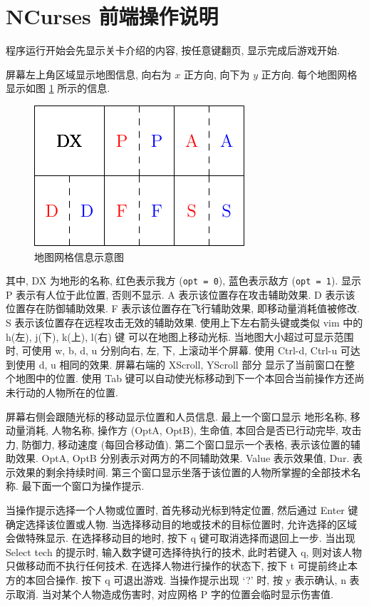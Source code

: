 \documentclass[UTF8, zihao=-4]{ctexart} %
\newcommand{\lcode}{\lstinline} % 段内插入代码
\begin{document}
\section{NCurses 前端操作说明}
\label{s_nc}
程序运行开始会先显示关卡介绍的内容, 按任意键翻页, 显示完成后游戏开始.

屏幕左上角区域显示地图信息, 向右为 $x$ 正方向, 向下为 $y$ 正方向. 
每个地图网格显示如图 \ref{f_grid} 所示的信息.
\begin{figure}
      \centering
      \includegraphics[scale=1.2]{grid.pdf}
      \caption{\label{f_grid}地图网格信息示意图}
\end{figure}
其中, DX 为地形的名称, 红色表示我方 (\lcode{opt = 0}), 蓝色表示敌方 (\lcode{opt = 1}).
显示 P 表示有人位于此位置, 否则不显示. A 表示该位置存在攻击辅助效果.
D 表示该位置存在防御辅助效果. F 表示该位置存在飞行辅助效果, 即移动量消耗值被修改.
S 表示该位置存在远程攻击无效的辅助效果. 使用上下左右箭头键或类似 vim 中的 h(左), j(下), k(上), l(右) 键
可以在地图上移动光标. 当地图大小超过可显示范围时, 可使用 w, b, d, u 分别向右, 左, 下, 上滚动半个屏幕. 
使用 Ctrl-d, Ctrl-u 可达到使用 d, u 相同的效果. 屏幕右端的 XScroll, YScroll 部分
显示了当前窗口在整个地图中的位置. 使用 Tab 键可以自动使光标移动到下一个本回合当前操作方还尚未行动的人物所在的位置.

屏幕右侧会跟随光标的移动显示位置和人员信息. 最上一个窗口显示
地形名称, 移动量消耗, 人物名称, 操作方 (OptA, OptB), 生命值, 本回合是否已行动完毕, 攻击力, 防御力, 移动速度 (每回合移动值).
第二个窗口显示一个表格, 表示该位置的辅助效果. OptA, OptB 分别表示对两方的不同辅助效果. Value 表示效果值, Dur. 表示效果的剩余持续时间.
第三个窗口显示坐落于该位置的人物所掌握的全部技术名称. 最下面一个窗口为操作提示. 

当操作提示选择一个人物或位置时, 首先移动光标到特定位置, 然后通过 Enter 键确定选择该位置或人物. 
当选择移动目的地或技术的目标位置时, 允许选择的区域会做特殊显示. 在选择移动目的地时, 
按下 q 键可取消选择而退回上一步. 当出现 Select tech 的提示时, 输入数字键可选择待执行的技术, 
此时若键入 q, 则对该人物只做移动而不执行任何技术. 在选择人物进行操作的状态下, 
按下 t 可提前终止本方的本回合操作. 按下 q 可退出游戏. 
当操作提示出现 `?' 时, 按 y 表示确认, n 表示取消. 当对某个人物造成伤害时, 对应网格 P 字的位置会临时显示伤害值.
\end{document}
